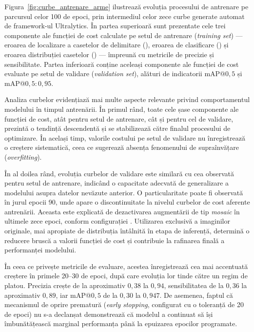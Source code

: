 \documentclass[../../main.tex]{subfiles}
\begin{document}
Figura~\ref{fig:curbe_antrenare_arme} ilustrează evoluția procesului de antrenare pe parcursul celor 100 de epoci, prin intermediul celor zece curbe generate automat de framework-ul Ultralytics. În partea superioară sunt prezentate cele trei componente ale funcției de cost calculate pe setul de antrenare (\textit{training set}) — eroarea de localizare a casetelor de delimitare (), eroarea de clasificare () și eroarea distribuției casetelor () — împreună cu metricile de precizie și sensibilitate. Partea inferioară conține aceleași componente ale funcției de cost evaluate pe setul de validare (\textit{validation set}), alături de indicatorii mAP@$0{,}5$ și mAP@$0{,}5{:}0{,}95$.

Analiza curbelor evidențiază mai multe aspecte relevante privind comportamentul modelului în timpul antrenării. În primul rând, toate cele șase componente ale funcției de cost, atât pentru setul de antrenare, cât și pentru cel de validare, prezintă o tendință descendentă și se stabilizează către finalul procesului de optimizare. În același timp, valorile costului pe setul de validare nu înregistrează o creștere sistematică, ceea ce sugerează absența fenomenului de supraînvățare (\textit{overfitting}).

În al doilea rând, evoluția curbelor de validare este similară cu cea observată pentru setul de antrenare, indicând o capacitate adecvată de generalizare a modelului asupra datelor nevăzute anterior. O particularitate poate fi observată în jurul epocii 90, unde apare o discontinuitate la nivelul curbelor de cost aferente antrenării. Aceasta este explicată de dezactivarea augmentării de tip \textit{mosaic} în ultimele zece epoci, conform configurației . Utilizarea exclusivă a imaginilor originale, mai apropiate de distribuția întâlnită în etapa de inferență, determină o reducere bruscă a valorii funcției de cost și contribuie la rafinarea finală a performanței modelului.

În ceea ce privește metricile de evaluare, acestea înregistrează cea mai accentuată creștere în primele 20–30 de epoci, după care evoluția lor tinde către un regim de platou. Precizia crește de la aproximativ $0{,}38$ la $0{,}94$, sensibilitatea de la $0{,}36$ la aproximativ $0{,}89$, iar mAP@$0{,}5$ de la $0{,}30$ la $0{,}947$. De asemenea, faptul că mecanismul de oprire prematură (\textit{early stopping}, configurat cu o toleranță de 20 de epoci) nu s-a declanșat demonstrează că modelul a continuat să își îmbunătățească marginal performanța până la epuizarea epocilor programate.
\end{document}
